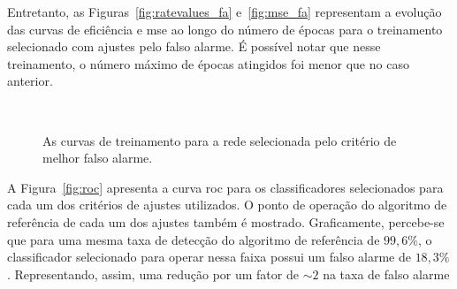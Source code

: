 Entretanto, as Figuras~\ref{fig:ratevalues_fa} e~\ref{fig:mse_fa} representam a evolução das curvas de eficiência e \gls{mse}
ao longo do número de épocas para o treinamento selecionado com ajustes pelo falso alarme. É possível notar que nesse
treinamento, o número máximo de épocas atingidos foi menor que no caso anterior.


\begin{figure}[ht!]

    \begin{center}
    
        \hspace{0.02\textwidth}
        \\ 

    \end{center}
    \caption[As curvas de treinamento para a rede selecionada pelo critério de melhor falso alarme.]{
    As curvas de treinamento para a rede selecionada pelo critério de melhor falso alarme.}

\end{figure}



A Figura~\ref{fig:roc} apresenta a curva \gls{roc} para os classificadores selecionados para cada um dos critérios de ajustes
utilizados. O ponto de operação do algoritmo de referência de cada um dos ajustes também é mostrado. Graficamente,
percebe-se que para uma mesma taxa de detecção do algoritmo de referência de $99,6\%$, o classificador selecionado
para operar nessa faixa possui um falso alarme de $18,3\%$. Representando, assim, uma redução por um fator de $\sim2$ 
na taxa de falso alarme


